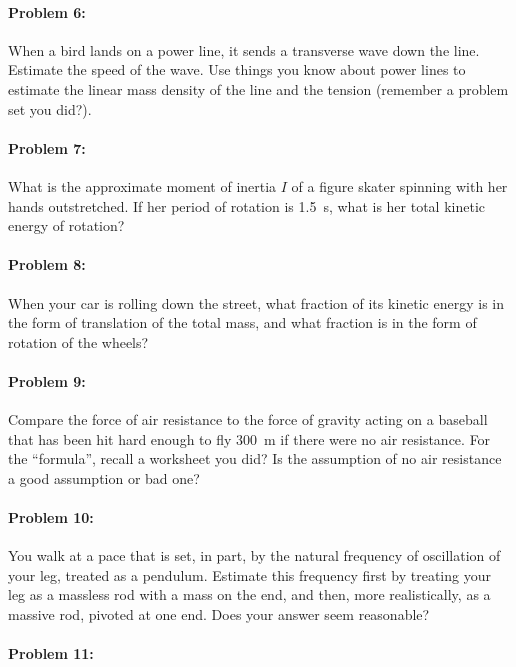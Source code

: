 \documentclass[12pt]{article}
\begin{document}
\paragraph{Problem 6:}

When a bird lands on a power line, it sends a transverse wave down the
line.  Estimate the speed of the wave.  Use things you know about
power lines to estimate the linear mass density of the line and the
tension (remember a problem set you did?).

\paragraph{Problem 7:}

What is the approximate moment of inertia $I$ of a figure skater
spinning with her hands outstretched.  If her period of rotation is
1.5~s, what is her total kinetic energy of rotation?

\paragraph{Problem 8:}

When your car is rolling down the street, what fraction of its kinetic
energy is in the form of translation of the total mass, and what
fraction is in the form of rotation of the wheels?

\paragraph{Problem 9:}

Compare the force of air resistance to the force of gravity acting on
a baseball that has been hit hard enough to fly 300~m if there were no
air resistance.  For the ``formula'', recall a worksheet you did?  Is
the assumption of no air resistance a good assumption or bad one?

\paragraph{Problem 10:}

You walk at a pace that is set, in part, by the natural frequency of
oscillation of your leg, treated as a pendulum.  Estimate this
frequency first by treating your leg as a massless rod with a mass on
the end, and then, more realistically, as a massive rod, pivoted at
one end.  Does your answer seem reasonable?

\paragraph{Problem 11:}
\end{document}
